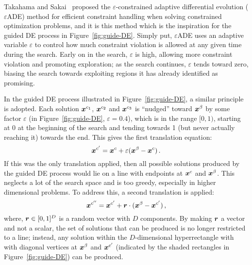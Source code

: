 Takahama and Sakai~\cite{takahama2010efficient} proposed the $\varepsilon$-constrained adaptive differential evolution ($\varepsilon$ADE) method for efficient constraint handling when solving constrained optimization problems, and it is this method which is the inspiration for the guided DE process in Figure~\ref{fig:guide-DE}. Simply put, $\varepsilon$ADE uses an adaptive variable $\varepsilon$ to control how much constraint violation is allowed at any given time during the search. Early on in the search, $\varepsilon$ is high, allowing more constraint violation and promoting exploration; as the search continues, $\varepsilon$ tends toward zero, biasing the search towards exploiting regions it has already identified as promising.

In the guided DE process illustrated in Figure~\ref{fig:guide-DE}, a similar principle is adopted. Each solution $\boldsymbol{x}^{c_1}$, $\boldsymbol{x}^{c_2}$ and $\boldsymbol{x}^{c_3}$ is ``nudged'' toward $\boldsymbol{x}^\beta$ by some factor $\varepsilon$ (in Figure~\ref{fig:guide-DE}, $\varepsilon=0.4$), which is in the range $[0,1)$, starting at 0 at the beginning of the search and tending towards 1 (but never actually reaching it) towards the end. This gives the first translation equation:
\begin{equation}\label{eq:nudge1}
\boldsymbol{x}^{c'} = \boldsymbol{x}^c + \varepsilon(\boldsymbol{x}^\beta - \boldsymbol{x}^c)\,.
\end{equation}
If this was the only translation applied, then all possible solutions produced by the guided DE process would lie on a line with endpoints at $\boldsymbol{x}^{c}$ and $\boldsymbol{x}^\beta$. This neglects a lot of the search space and is too greedy, especially in higher dimensional problems. To address this, a second translation is applied:
\begin{equation}\label{eq:nudge2}
\boldsymbol{x}^{c''} = \boldsymbol{x}^{c'} + \boldsymbol{r} \cdot (\boldsymbol{x}^\beta - \boldsymbol{x}^{c'})\,,
\end{equation}
where, $\boldsymbol{r}\in [0,1]^D$ is a random vector with $D$ components. By making $\boldsymbol{r}$ a vector and not a scalar, the set of solutions that can be produced is no longer restricted to a line; instead, any solution within the $D$-dimensional hyperrectangle with with diagonal vertices at $\boldsymbol{x}^\beta$ and $\boldsymbol{x}^{c'}$ (indicated by the shaded rectangles in Figure~\ref{fig:guide-DE}) can be produced.

